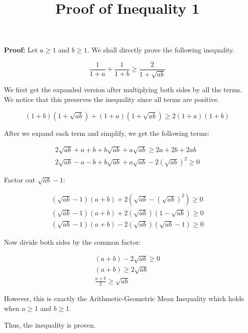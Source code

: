 \documentclass[11pt]{article}
\title{Proof of Inequality 1}
\author{\Name}
\begin{document}
\maketitle

\textbf{Proof:}
Let $a \geq 1$ and $b \geq 1$. We shall directly prove the following inequality.

\begin{equation}
\frac{1}{1+a} + \frac{1}{1+b} \geq \frac{2}{1 + \sqrt{ab}} 
\end{equation}

We first get the expanded version after multiplying both sides by all the terms. We notice that this preserves the inequality since all terms are positive.

\begin{equation}
(1+b)(1 + \sqrt{ab}) + (1+a)(1 + \sqrt{ab}) \geq 2(1+a)(1+b)
\end{equation}

After we expand each term and simplify, we get the following terms:

\begin{gather}
 2\sqrt{ab} + a + b + b\sqrt{ab} + a\sqrt{ab} \geq 2a + 2b + 2ab \\
 2\sqrt{ab} - a - b + b\sqrt{ab} + a\sqrt{ab} - 2(\sqrt{ab})^2 \geq 0
\end{gather}

Factor out $\sqrt{ab} - 1$:

\begin{gather}
 (\sqrt{ab} - 1)(a+b) + 2(\sqrt{ab} - (\sqrt{ab})^2) \geq 0 \\ 
 (\sqrt{ab} - 1)(a+b) + 2(\sqrt{ab})(1 - \sqrt{ab}) \geq 0 \\
 (\sqrt{ab} - 1)(a+b) - 2(\sqrt{ab})(\sqrt{ab} - 1) \geq 0 
\end{gather}

Now divide both sides by the common factor:

\begin{gather}
 (a + b) - 2\sqrt{ab} \geq 0 \\
 (a + b) \geq 2\sqrt{ab} \\
 \frac{a + b}{2} \geq \sqrt{ab}
\end{gather}

However, this is exactly the Arithmetic-Geometric Mean Inequality which holds when $a \geq 1$ and $b \geq 1$.

Thus, the inequality is proven.
\end{document}
